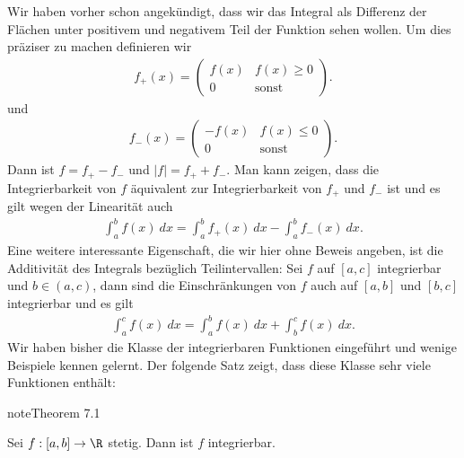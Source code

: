 \documentclass[letterpaper,10pt,english]{jupyterBook}
\begin{document}
Wir haben vorher schon angekündigt, dass wir das Integral als Differenz der Flächen unter positivem und negativem Teil der Funktion sehen wollen. Um dies präziser zu machen definieren wir
\begin{equation*}
\begin{split} f_+(x) = \begin{pmatrix} f(x) & f(x) \geq 0 \\ 0 & \text{sonst} \end{pmatrix}.\end{split}
\end{equation*}
und
\begin{equation*}
\begin{split}  f_-(x) = \begin{pmatrix}-f(x) & f(x) \leq 0 \\ 0 & \text{sonst} \end{pmatrix}.\end{split}
\end{equation*}
Dann ist \(f = f_+ - f_-\) und \(|f|=f_+ + f_-\). Man kann zeigen, dass die Integrierbarkeit von \(f\) äquivalent zur Integrierbarkeit von \(f_+\) und \(f_-\) ist und es gilt wegen der Linearität auch
\begin{equation*}
\begin{split} \int_a^b f(x)~dx = \int_a^b f_+(x)~dx - \int_a^b f_-(x)~dx.\end{split}
\end{equation*}
Eine weitere interessante Eigenschaft, die wir hier ohne Beweis angeben, ist die Additivität des Integrals bezüglich Teilintervallen: Sei \(f\) auf \([a,c]\) integrierbar und \(b \in (a,c)\), dann sind die Einschränkungen von \(f\) auch auf \([a,b]\) und \([b,c]\) integrierbar und es gilt
\begin{equation*}
\begin{split} \int_a^c f(x)~dx =  \int_a^b f(x)~dx + \int_b^c f(x)~dx .\end{split}
\end{equation*}
Wir haben bisher die Klasse der integrierbaren Funktionen eingeführt und wenige Beispiele kennen gelernt. Der folgende Satz zeigt, dass diese Klasse sehr viele Funktionen enthält:
\label{integration/riemann:theorem-3}
\begin{sphinxadmonition}{note}{Theorem 7.1}



Sei \(f:[a,b] \rightarrow \R\) stetig. Dann ist \(f\) integrierbar.
\end{sphinxadmonition}
\end{document}
